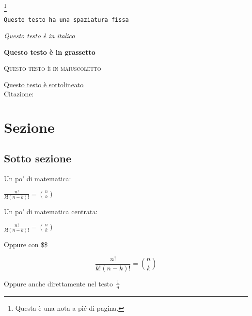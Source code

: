 \documentclass[twoside]{supsistudent}
\begin{document}
\footnote{Questa è una nota a pi\'e di pagina.}

\texttt{Questo testo ha una spaziatura fissa}

\textit{Questo testo \`e in italico}

\textbf{Questo testo \`e in grassetto}

\textsc{Questo testo \`e in maiuscoletto}

\underline{Questo testo \`e sottolineato} \\

Citazione:
\begin{quote}
\lipsum[23]
\end{quote}

\section{Sezione}

\lipsum[23]

\subsection{Sotto sezione}

Un po' di matematica: \newline

\begin{math}
\frac{n!}{k!(n-k)!} = {n \choose k}
\end{math} \newline

Un po' di matematica centrata:

\begin{center}
\begin{math}
\frac{n!}{k!(n-k)!} = {n \choose k}
\end{math}
\end{center}

Oppure con \$\$

$$
\frac{n!}{k!(n-k)!} = {n \choose k}
$$

Oppure anche direttamente nel testo ${1}\over{n}$ \\

\lipsum[23]



\end{document}
